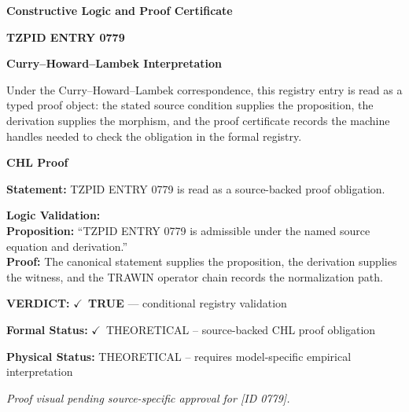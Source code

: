 \clearpage
\begingroup\tzpsupportsetup
\noindent\textbf{\fontsize{10.8pt}{12.8pt}\selectfont [ID 0779] Constructive Logic and Proof Certificate}\par
\noindent\textbf{\fontsize{10pt}{12pt}\selectfont TZPID ENTRY 0779}\par
\vspace{0.45em}
\begingroup
\footnotesize
\setlength{\parskip}{0.22em}
\setlength{\parindent}{0pt}
\noindent\textbf{Curry--Howard--Lambek Interpretation}\par
Under the Curry--Howard--Lambek correspondence, this registry entry is read as a typed proof
object: the stated source condition supplies the proposition, the derivation supplies the
morphism, and the proof certificate records the machine handles needed to check the obligation
in the formal registry.

\vspace{0.45em}
\noindent\textbf{CHL Proof}\par
\textbf{Statement:} TZPID ENTRY 0779 is read as a source-backed proof obligation.

\textbf{Logic Validation:}\\
\textbf{Proposition:} ``TZPID ENTRY 0779 is admissible under the named source equation and derivation.''\\
\textbf{Proof:} The canonical statement supplies the proposition, the derivation supplies the witness, and the TRAWIN operator chain records the normalization path.

\textbf{VERDICT:} \ensuremath{\checkmark}\ \textbf{TRUE} --- conditional registry validation

\textbf{Formal Status:} \ensuremath{\checkmark}\ THEORETICAL -- source-backed CHL proof obligation

\textbf{Physical Status:} THEORETICAL -- requires model-specific empirical interpretation
\par\vspace{0.45em}
\par
\vfill
\begingroup\footnotesize\itshape
Proof visual pending source-specific approval for [ID 0779].
\par\endgroup
\vfill
\endgroup
\endgroup
